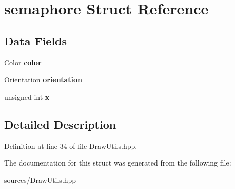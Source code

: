 \hypertarget{structsemaphore}{\section{semaphore Struct Reference}
\label{structsemaphore}
}
\subsection*{Data Fields}
\begin{DoxyCompactItemize}
\item 
\hypertarget{structsemaphore_a1e2b095dc2cb55c1dfcb089e6af08428}{Color {\bfseries color}}\label{structsemaphore_a1e2b095dc2cb55c1dfcb089e6af08428}

\item 
\hypertarget{structsemaphore_a452a3ad1736c394cfe216a3dfbaee9aa}{Orientation {\bfseries orientation}}\label{structsemaphore_a452a3ad1736c394cfe216a3dfbaee9aa}

\item 
\hypertarget{structsemaphore_a519037df11ca0571309a471acdc4cc93}{unsigned int {\bfseries x}}\label{structsemaphore_a519037df11ca0571309a471acdc4cc93}

\end{DoxyCompactItemize}


\subsection{Detailed Description}


Definition at line 34 of file Draw\-Utils.\-hpp.



The documentation for this struct was generated from the following file\-:\begin{DoxyCompactItemize}
\item 
sources/Draw\-Utils.\-hpp\end{DoxyCompactItemize}
